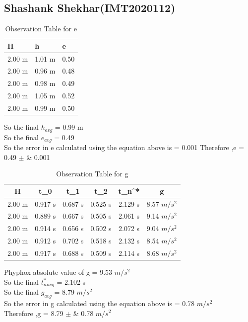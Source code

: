 \documentclass[11pt]{scrartcl} %
\begin{document}
\subsection{Shashank Shekhar(IMT2020112)}

\begin{table}[h] %
	\centering %
	\begin{tabular}{l l l}
		\toprule
		\textbf{H} & \textbf{h} & \textbf{e} \\
		\midrule
		2.00 m & 1.01 m & 0.50\\
        2.00 m & 0.96 m  & 0.48\\
        2.00 m & 0.98 m  & 0.49\\
        2.00 m & 1.05 m & 0.52 \\
        2.00 m & 0.99 m & 0.50 \\
		\bottomrule
	\end{tabular}
	\caption{Observation Table for e}
\end{table}
So the final $h_{avg}$ = 0.99 m\\
So the final $e_{avg}$ = 0.49\\
So the error in e calculated using the equation above is  = 0.001 \newline
Therefore ,e = 0.49  $\pm$ &  0.001 \\

\begin{table}[h]
\centering
\begin{tabular}{||c c c c c c||} 
\toprule
 \hline
 H & t_0 & t_1 & t_2 & t_n^* & g \\ [0.5ex] 
 \midrule
 \hline\hline
 2.00 m & 0.917 s & 0.687 s  & 0.525 s & 2.129 s & 8.57 $m/s^2$  \\ 
 \hline
 2.00 m & 0.889 s & 0.667 s & 0.505 s & 2.061 s & 9.14 $m/s^2$  \\
 \hline 
 2.00 m & 0.914 s & 0.656 s & 0.502 s & 2.072 s  & 9.04 $m/s^2$   \\
 \hline
 2.00 m & 0.912 s & 0.702 s & 0.518 s & 2.132 s  & 8.54 $m/s^2$   \\
 \hline
 2.00 m & 0.917 s & 0.688 s & 0.509 s & 2.114 s  & 8.68 $m/s^2$  \\ 
 [1ex]
 \bottomrule
 \hline
\end{tabular}
\caption{Observation Table for g}
\end{table}
Phyphox absolute value of g = 9.53 $m/s^2$\\
So the final $t_n^*_{avg}$ = 2.102 s\\
So the final $g_{avg}$ = 8.79 $m/s^2$\\
So the error in g calculated using the equation above is  = 0.78 $m/s^2$\\
Therefore ,g = 8.79  $\pm$ &  0.78 $m/s^2$ \\
\newpage
\end{document}
